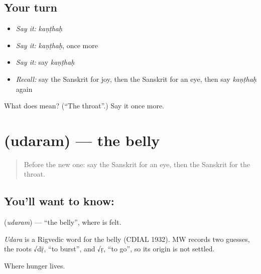 \subsection*{Your turn}
\begin{itemize}
\raggedright
  \item \emph{Say it:} \emph{kaṇṭhaḥ}
  \item \emph{Say it:} \emph{kaṇṭhaḥ}, once more
  \item \emph{Say it:} say \emph{kaṇṭhaḥ}
  \item \emph{Recall:} say the Sanskrit for joy, then the Sanskrit for an eye, then say \emph{kaṇṭhaḥ} again
\end{itemize}

\begin{tcolorbox}[breakable,colback=teal!4,colframe=teal!35!black,title={Before you move on}]
What does  mean? (\textquotedblleft{}The throat\textquotedblright{}.) Say it once more.
\end{tcolorbox}
\section[\texorpdfstring{\sk{उदरम्} (udaram)}{उदरम् (udaram)}]{ (udaram) — the belly}

\label{lesson:SA-C69-belly}



\begin{quote}
Before the new one: say the Sanskrit for an eye, then the Sanskrit for the throat.
\end{quote}

\subsection*{You'll want to know: }
\textbf{} (\emph{udaram}) — \textquotedblleft{}the belly\textquotedblright{}, where \textbf{} is felt.

\begin{cousinweb}
\emph{Udara} is a Rigvedic word for the belly (CDIAL 1932). MW records two guesses, the roots √dṝ, \textquotedblleft{}to burst\textquotedblright{}, and √ṛ, \textquotedblleft{}to go\textquotedblright{}, so its origin is not settled.
\end{cousinweb}

\begin{grammarlens}[title={What you've built}]
Where hunger lives.
\end{grammarlens}

